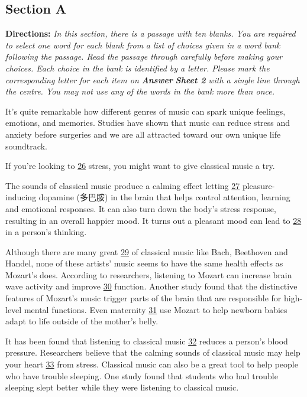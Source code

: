 \documentclass[UTF8,11pt]{ctexart}
\begin{document}
\subsection*{\textbf{Section A}}


\textbf{Directions:} \textit{In this section, there is a passage with ten blanks. You are required to select one word for each blank from} \textit{a list of choices given in a word bank following the passage. Read the passage through carefully before making your} \textit{choices. Each choice in the bank is identified by a letter. Please mark the corresponding letter for each item on }\textbf{\textit{Answer}} \textbf{\textit{Sheet 2}}\textit{ with a single line through the centre. You may not use any of the words in the bank more than once.}


It’s quite remarkable how different genres of music can spark unique feelings, emotions, and memories. Studies have shown that music can reduce stress and anxiety before surgeries and we are all attracted toward our own unique life soundtrack.


If you’re looking to \uline{26} stress, you might want to give classical music a try.


The sounds of classical music produce a calming effect letting \uline{27} pleasure-inducing dopamine (多巴胺) in the brain that helps control attention, learning and emotional responses. It can also turn down the body’s stress response, resulting in an overall happier mood. It turns out a pleasant mood can lead to \uline{28} in a person’s thinking.


Although there are many great \uline{29} of classical music like Bach, Beethoven and Handel, none of these artists’ music seems to have the same health effects as Mozart’s does. According to researchers, listening to Mozart can increase brain wave activity and improve \uline{30} function. Another study found that the distinctive features of Mozart’s music trigger parts of the brain that are responsible for high-level mental functions. Even maternity \uline{31} use Mozart to help newborn babies adapt to life outside of the mother’s belly.


It has been found that listening to classical music \uline{32} reduces a person’s blood pressure. Researchers believe that the calming sounds of classical music may help your heart \uline{33} from stress. Classical music can also be a great tool to help people who have trouble sleeping. One study found that students who had trouble sleeping slept better while they were listening to classical music.
\end{document}
